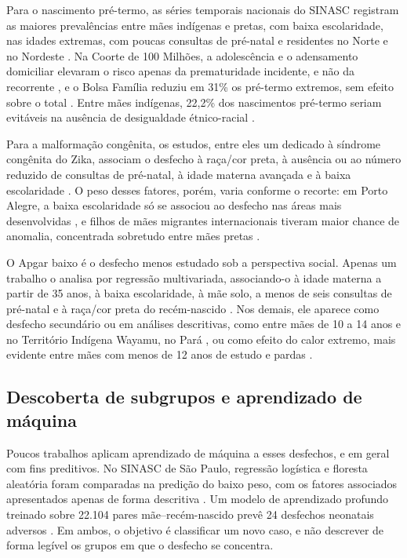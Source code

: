 Para o nascimento pré-termo, as séries temporais nacionais do SINASC registram as maiores prevalências entre mães indígenas e pretas, com baixa escolaridade, nas idades extremas, com poucas consultas de pré-natal e residentes no Norte e no Nordeste \cite{alberton2023,victor2025}. Na Coorte de 100 Milhões, a adolescência e o adensamento domiciliar elevaram o risco apenas da prematuridade incidente, e não da recorrente \cite{rocha2022}, e o Bolsa Família reduziu em 31\% os pré-termo extremos, sem efeito sobre o total \cite{ortelan2024}. Entre mães indígenas, 22,2\% dos nascimentos pré-termo seriam evitáveis na ausência de desigualdade étnico-racial \cite{reboucas2024}.

Para a malformação congênita, os estudos, entre eles um dedicado à síndrome congênita do Zika, associam o desfecho à raça/cor preta, à ausência ou ao número reduzido de consultas de pré-natal, à idade materna avançada e à baixa escolaridade \cite{fernandes2025,trevilato2022,paixao2022,melkan2025}. O peso desses fatores, porém, varia conforme o recorte: em Porto Alegre, a baixa escolaridade só se associou ao desfecho nas áreas mais desenvolvidas \cite{anele2022}, e filhos de mães migrantes internacionais tiveram maior chance de anomalia, concentrada sobretudo entre mães pretas \cite{pescarini2024}.

O Apgar baixo é o desfecho menos estudado sob a perspectiva social. Apenas um trabalho o analisa por regressão multivariada, associando-o à idade materna a partir de 35 anos, à baixa escolaridade, à mãe solo, a menos de seis consultas de pré-natal e à raça/cor preta do recém-nascido \cite{magalhaes2023}. Nos demais, ele aparece como desfecho secundário ou em análises descritivas, como entre mães de 10 a 14 anos \cite{pinto2024} e no Território Indígena Wayamu, no Pará \cite{lima2025}, ou como efeito do calor extremo, mais evidente entre mães com menos de 12 anos de estudo e pardas \cite{delcarretto2025}.

\subsection{Descoberta de subgrupos e aprendizado de máquina}\label{subsec:rel-subgrupos}

Poucos trabalhos aplicam aprendizado de máquina a esses desfechos, e em geral com fins preditivos. No SINASC de São Paulo, regressão logística e floresta aleatória foram comparadas na predição do baixo peso, com os fatores associados apresentados apenas de forma descritiva \cite{almeida2026}. Um modelo de aprendizado profundo treinado sobre 22.104 pares mãe--recém-nascido prevê 24 desfechos neonatais adversos \cite{defrancesco2023}. Em ambos, o objetivo é classificar um novo caso, e não descrever de forma legível os grupos em que o desfecho se concentra.

